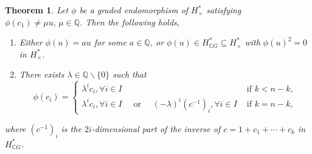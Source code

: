 \documentclass{amsart}
\newtheorem{theorem}{Theorem}[section]
\begin{document}
	
	
	
	
	
	
	\begin{theorem}\label{main thm}
		Let $\phi$ be a graded endomorphism of $H^*_{\times}$ satisfying $\phi(c_1) \neq \mu u,\, \mu \in \mathbb{Q}$.  
		Then the following holds, \begin{enumerate}
			\item Either $\phi(u)=au$ for some $a \in \mathbb{Q}$, or $\phi(u) \in H^*_{\mathbb{C}G} \subseteq H^*_{\times}$ with $\phi(u)^2=0$ in $H^*_{\times}$.
			\item There exists $\lambda \in \mathbb Q\backslash\{0\}$ such that
			$$\phi(c_i) = \begin{cases}
				\lambda^i c_i,   \forall i \in I& \text{ if } k<n-k,\\
				\lambda^i c_i,  \forall i \in I \quad \text{ or } \quad(-\lambda)^i (c^{-1})_i,    \forall i \in I & \text{ if } k= n-k,
			\end{cases}$$
		\end{enumerate} where $ (c^{-1})_i $ is the $ 2i $-dimensional part of the inverse of $ c = 1 + c_1 + \cdots + c_k $ in $ H^*_{ \mathbb CG} $.
	\end{theorem}
	
	
\end{document}
